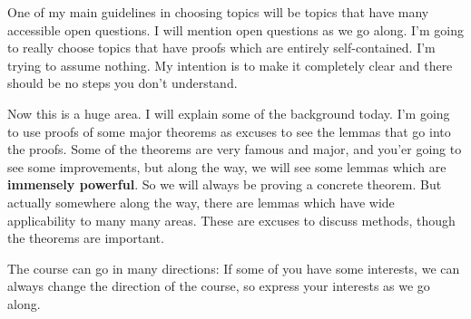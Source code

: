 One of my main guidelines in choosing topics will be topics that have many accessible open questions. I will mention open questions as we go along. I'm going to really choose topics that have proofs which are entirely self-contained. I'm trying to assume nothing. My intention is to make it completely clear and there should be no steps you don't understand. 

Now this is a huge area. I will explain some of the background today. I'm going to use proofs of some major theorems as excuses to see the lemmas that go into the proofs. Some of the theorems are very famous and major, and you'er going to see some improvements, but along the way, we will see some lemmas which are \textbf{immensely powerful}. So we will always be proving a concrete theorem. But actually somewhere along the way, there are lemmas which have wide applicability to many many areas. These are excuses to discuss methods, though the theorems are important. 

The course can go in many directions: If some of you have some interests, we can always change the direction of the course, so express your interests as we go along. 


















%

%
%

\printnomenclature
\printindex
